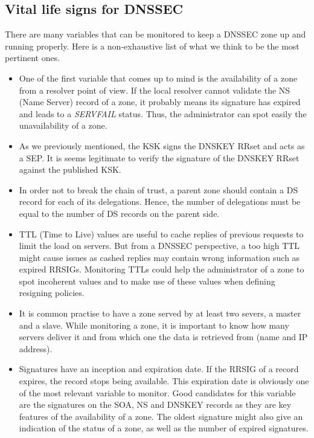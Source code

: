 \subsection{Vital life signs for DNSSEC}
\label{section:vital-life-signs-dnssec}
There are many variables that can be monitored to keep a DNSSEC zone up and running properly. Here is a non-exhaustive list of what we think to be the most pertinent ones.


\begin{itemize}
\item One of the first variable that comes up to mind is the availability of a zone from a resolver point of view. If the local resolver cannot validate the NS (Name Server) record of a zone, it probably means its signature has expired and leads to a \textit{SERVFAIL} status. Thus, the administrator can spot easily the unavailability of a zone.

\item As we previously mentioned, the KSK signs the DNSKEY RRset and acts as a SEP. It is seems legitimate to verify the signature of the DNSKEY RRset against the published KSK. 

\item In order not to break the chain of trust, a parent zone should contain a DS record for each of its delegations. Hence, the number of delegations must be equal to the number of DS records on the parent side. 

\item TTL (Time to Live) values are useful to cache replies of previous requests to limit the load on servers. But from a DNSSEC perspective, a too high TTL might cause issues as cashed replies may contain wrong information such as expired RRSIGs. Monitoring TTLs could help the administrator of a zone to spot incoherent values and to make use of these values when defining resigning policies.

\item It is common practise to have a zone served by at least two severs, a master and a slave. While monitoring a zone, it is important to know how many servers deliver it and from which one the data is retrieved from (name and IP address).

\item Signatures have an inception and expiration date. If the RRSIG of a record expires, the record stops being available. This expiration date is obviously one of the most relevant variable to monitor. Good candidates for this variable are the signatures on the SOA, NS and DNSKEY records as they are key features of the availability of a zone. The oldest signature might also give an indication of the status of a zone, as well as the number of expired signatures.


\end{itemize}
